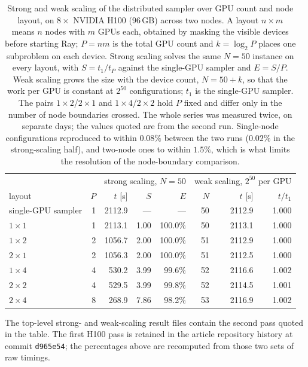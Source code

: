 \documentclass[12pt,a4paper]{elsarticle}
\begin{document}
\begin{table}[H]
\setlength{\tabcolsep}{4pt}
\centering
\small
\begin{tabular}{|l|r|rrr|rrr|}
\hline
 &  & \multicolumn{3}{c|}{strong scaling, $N=50$} &
\multicolumn{3}{c|}{weak scaling, $2^{50}$ per GPU} \\
layout & $P$ & $t$ [s] & $S$ & $E$ & $N$ & $t$ [s] & $t/t_1$ \\
\hline
single-GPU sampler & 1 & 2112.9 & --- & --- & 50 & 2112.9 & 1.000 \\
$1\times1$ & 1 & 2113.1 & 1.00 & 100.0\% & 50 & 2113.1 & 1.000 \\
$1\times2$ & 2 & 1056.7 & 2.00 & 100.0\% & 51 & 2112.9 & 1.000 \\
$2\times1$ & 2 & 1056.3 & 2.00 & 100.0\% & 51 & 2112.5 & 1.000 \\
$1\times4$ & 4 & 530.2  & 3.99 & 99.6\%  & 52 & 2116.6 & 1.002 \\
$2\times2$ & 4 & 529.5  & 3.99 & 99.8\%  & 52 & 2114.5 & 1.001 \\
$2\times4$ & 8 & 268.9  & 7.86 & 98.2\%  & 53 & 2116.9 & 1.002 \\
\hline
\end{tabular}
\caption{Strong and weak scaling of the distributed sampler over GPU count and node layout,
on $8\times$ NVIDIA H100 (96\,GB) across two nodes. A layout $n\times m$ means $n$ nodes with
$m$ GPUs each, obtained by masking the visible devices before starting Ray; $P=nm$ is the
total GPU count and $k=\log_2 P$ places one subproblem on each device. Strong scaling solves
the same $N=50$ instance on every layout, with $S=t_1/t_P$ against the single-GPU sampler and
$E=S/P$. Weak scaling grows the size with the device count, $N=50+k$, so that the work per GPU
is constant at $2^{50}$ configurations; $t_1$ is the single-GPU sampler. The pairs
$1\times2$/$2\times1$ and $1\times4$/$2\times2$ hold $P$ fixed and differ only in the number of
node boundaries crossed. The whole series was measured twice, on separate days; the values
quoted are from the second run. Single-node configurations reproduced to within $0.08\%$
between the two runs ($0.02\%$ in the strong-scaling half), and two-node ones to within
$1.5\%$, which is what limits the resolution of
the node-boundary comparison.}
\label{tab:scaling}
\end{table}

The top-level strong- and weak-scaling result files contain the second pass quoted in the table. The first H100
pass is retained in the article repository history at commit \texttt{d965e54}; the percentages
above are recomputed from those two sets of raw timings.
\end{document}

